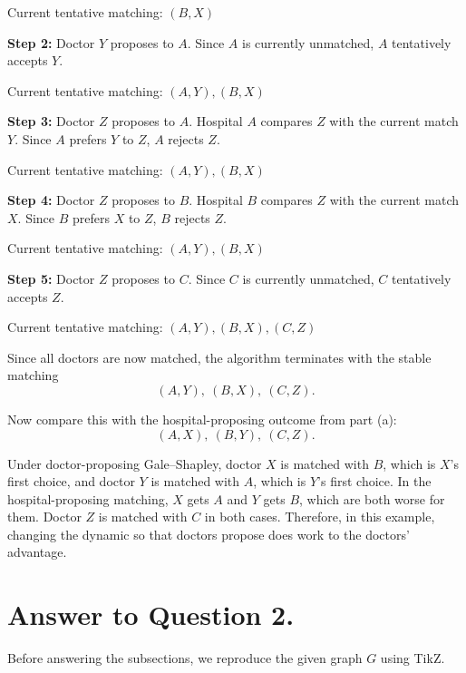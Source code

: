 \documentclass{brockcosc3p03}
\begin{document}
Current tentative matching: $(B,X)$

\textbf{Step 2:} Doctor $Y$ proposes to $A$. Since $A$ is currently unmatched, $A$ tentatively accepts $Y$.

Current tentative matching: $(A,Y), (B,X)$

\textbf{Step 3:} Doctor $Z$ proposes to $A$. Hospital $A$ compares $Z$ with the current match $Y$. Since $A$ prefers $Y$ to $Z$, $A$ rejects $Z$.

Current tentative matching: $(A,Y), (B,X)$

\textbf{Step 4:} Doctor $Z$ proposes to $B$. Hospital $B$ compares $Z$ with the current match $X$. Since $B$ prefers $X$ to $Z$, $B$ rejects $Z$.

Current tentative matching: $(A,Y), (B,X)$

\textbf{Step 5:} Doctor $Z$ proposes to $C$. Since $C$ is currently unmatched, $C$ tentatively accepts $Z$.

Current tentative matching: $(A,Y), (B,X), (C,Z)$

Since all doctors are now matched, the algorithm terminates with the stable matching
\[
(A,Y),\ (B,X),\ (C,Z).
\]

Now compare this with the hospital-proposing outcome from part (a):
\[
(A,X),\ (B,Y),\ (C,Z).
\]

Under doctor-proposing Gale--Shapley, doctor $X$ is matched with $B$, which is $X$'s first choice, and doctor $Y$ is matched with $A$, which is $Y$'s first choice. In the hospital-proposing matching, $X$ gets $A$ and $Y$ gets $B$, which are both worse for them. Doctor $Z$ is matched with $C$ in both cases. Therefore, in this example, changing the dynamic so that doctors propose does work to the doctors' advantage.

\newpage
\section*{Answer to Question 2.}

Before answering the subsections, we reproduce the given graph $G$ using TikZ.
\end{document}
